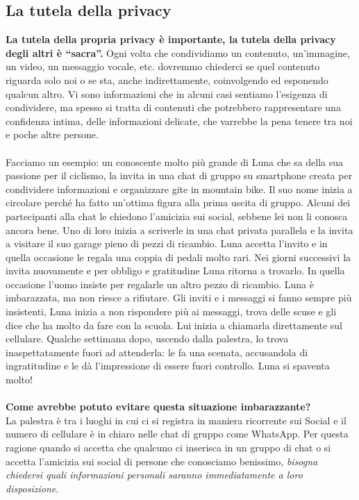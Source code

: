 \documentclass{article}
\begin{document}
\subsection{La tutela della privacy}
\textbf{La tutela della propria privacy è importante, la tutela della privacy degli altri è “sacra”.} Ogni volta che condividiamo un contenuto, un’immagine, un video, un messaggio vocale, etc. dovremmo chiederci se quel contenuto riguarda solo noi o se sta, anche indirettamente, coinvolgendo ed esponendo qualcun altro. Vi sono informazioni che in alcuni casi sentiamo l’esigenza di condividere, ma spesso si tratta di contenuti che potrebbero rappresentare una confidenza intima, delle informazioni delicate, che varrebbe la pena tenere tra noi e poche altre persone.
\\\vspace{5mm}\\
Facciamo un esempio: un conoscente molto più grande di Luna che sa della sua passione per il ciclismo, la invita in una chat di gruppo su smartphone creata per condividere informazioni e organizzare gite in mountain bike. Il suo nome inizia a circolare perché ha fatto un'ottima figura alla prima uscita di gruppo. Alcuni dei partecipanti alla chat le chiedono l’amicizia sui social, sebbene lei non li conosca ancora bene. Uno di loro inizia a scriverle in una chat privata parallela e la invita a visitare il suo garage pieno di pezzi di ricambio. Luna accetta l’invito e in quella occasione le regala una coppia di pedali molto rari. Nei giorni successivi la invita nuovamente e per obbligo e gratitudine Luna ritorna a trovarlo. In quella occasione l'uomo insiste per regalarle un altro pezzo di ricambio. Luna è imbarazzata, ma non riesce a rifiutare. Gli inviti e i messaggi si fanno sempre più insistenti, Luna inizia a non rispondere più ai messaggi, trova delle scuse e gli dice che ha molto da fare con la scuola. Lui inizia a chiamarla direttamente sul cellulare. Qualche settimana dopo, uscendo dalla palestra, lo trova inaspettatamente fuori ad attenderla: le fa una scenata, accusandola di ingratitudine e le dà l’impressione di essere fuori controllo. Luna si spaventa molto!
\\\vspace{5mm}\\
\textbf{Come avrebbe potuto evitare questa situazione imbarazzante?}\\
La palestra è tra i luoghi in cui ci si registra in maniera ricorrente sui Social e il numero di cellulare è in chiaro nelle chat di gruppo come WhatsApp. Per questa ragione quando si accetta che qualcuno ci inserisca in un gruppo di chat o si accetta l’amicizia sui social di persone che conosciamo benissimo, \textit{bisogna chiedersi quali informazioni personali saranno immediatamente a loro disposizione}.\\
\end{document}
